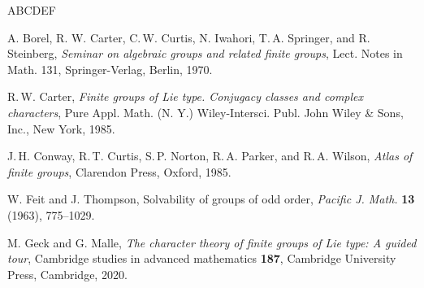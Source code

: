 \documentclass[12pt]{amsart}
\theoremstyle{definition}
\numberwithin{equation}{section}
\begin{document}

\begin{thebibliography}{ABCDEF}

A. Borel, R. W. Carter, C.\,W. Curtis, N. Iwahori, T.\,A. Springer,
and R. Steinberg, \emph{Seminar on algebraic groups and related
finite groups}, Lect. Notes in Math. 131, Springer-Verlag, Berlin,
1970.

R.\,W. %
Carter, \emph{Finite groups of Lie type. Conjugacy classes
and complex characters}, Pure %
Appl. Math. (N. Y.) Wiley-Intersci.
Publ. John Wiley \& Sons, Inc., New York, 1985.

  J.\,H. Conway, R.\,T. Curtis, S.\,P. Norton, R.\,A. Parker, and R.\,A. Wilson,
 {\it Atlas %
of finite groups}, Clarendon %
Press, Oxford, 1985.


W. Feit and J. %
Thompson, Solvability of groups of odd order,
\emph{Pacific J. Math.} \textbf{13} %
(1963), 775--1029.





M. Geck and G. Malle, {\it The character theory of finite groups of
Lie %
type: A guided %
tour}, Cambridge studies in advanced mathematics
\textbf{187}, Cambridge University Press, Cambridge, 2020.


\end{thebibliography}
\end{document}
